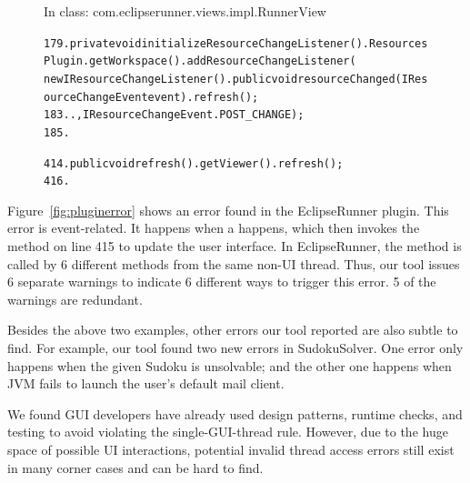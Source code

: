 \begin{figure}[t]
\hspace{4mm}\small{In class: com.eclipserunner.views.impl.RunnerView}
\vspace{-2mm}
\begin{CodeOut}
\begin{alltt} 
179.private void initializeResourceChangeListener() .  ResourcesPlugin.getWorkspace().addResourceChangeListener(
        new IResourceChangeListener() .      public void resourceChanged(IResourceChangeEvent event) .        refresh();
183.      .  \ttrcb, IResourceChangeEvent.POST\_CHANGE);
185.\ttrcb

414.public void refresh() .  getViewer().refresh();
416.\ttrcb
\end{alltt}
\end{CodeOut}
\smallstep
\vspace*{-2.0ex}  %
\end{figure}

Figure~\ref{fig:pluginerror} shows an error found in the EclipseRunner
plugin. This error is event-related. It happens when a 
 happens, which then invokes the 
method on line 415 to update the user interface. In EclipseRunner,
the  method is
called by 6 different methods from the same non-UI thread. Thus, our
tool issues 6 separate warnings to indicate
6 different ways to trigger this error. 5 of the warnings are redundant.

Besides the above two examples, other errors our tool reported are also
subtle to find. For example, our tool found two new errors in SudokuSolver.
One error only happens when
the given Sudoku is unsolvable; and the other one happens
when  JVM fails to launch the %
user's default mail client.%

We found GUI developers have already
used design patterns, runtime checks, and testing to avoid violating
the single-GUI-thread rule. However, due to the huge space of
possible UI interactions, potential
invalid thread access errors still exist in many corner cases and
can be hard to find. 


